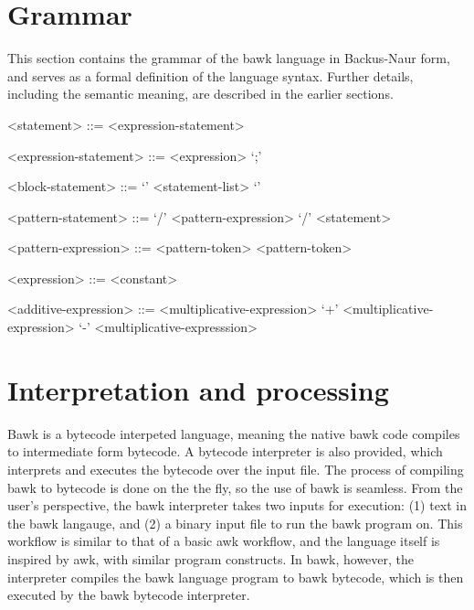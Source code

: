 \documentclass[letterpaper]{article}
\begin{document}
\section{Grammar}
This section contains the grammar of the bawk language in Backus-Naur form, and serves as a formal definition of the language syntax.  Further details, including the semantic meaning, are described in the earlier sections.
\begin{grammar}

<statement> ::= <expression-statement>

<expression-statement> ::= <expression> `;'

<block-statement> ::= `{' <statement-list> `}'

<pattern-statement> ::= `/' <pattern-expression> `/' <statement>

<pattern-expression> ::= <pattern-token>
 <pattern-token>


<expression> ::= <constant>

<additive-expression> ::= <multiplicative-expression>
 `+' <multiplicative-expression>
 `-' <multiplicative-expresssion>
\end{grammar}

\section{Interpretation and processing}
\label{sec:interpretation}
Bawk is a bytecode interpeted language, meaning the native bawk code compiles to intermediate form bytecode.  A bytecode interpreter is also provided, which interprets and executes the bytecode over the input file.  The process of compiling bawk to bytecode is done on the the fly, so the use of bawk is seamless.  From the user's perspective, the bawk interpreter takes two inputs for execution: (1) text in the bawk langauge, and (2) a binary input file to run the bawk program on.  This workflow is similar to that of a basic awk workflow, and the language itself is inspired by awk, with similar program constructs.  In bawk, however, the interpreter compiles the bawk language program to bawk bytecode, which is then executed by the bawk bytecode interpreter.
\end{document}
